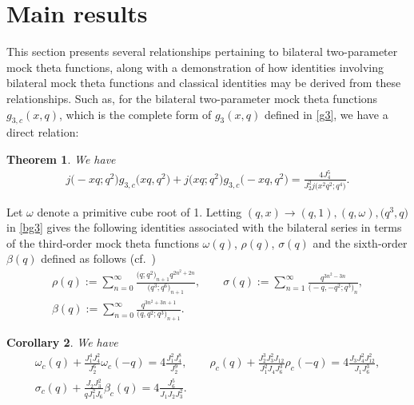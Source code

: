 \documentclass[pdftex]{sigma}
\numberwithin{equation}{section}
\newtheorem{Theorem}{Theorem}[section]
\newtheorem{Corollary}[Theorem]{Corollary}
\begin{document}
\section{Main results}

This section presents several relationships pertaining to bilateral two-parameter mock theta functions, along with a demonstration of how identities involving bilateral mock theta functions and classical identities may be derived from these relationships. Such as, for the bilateral two-parameter mock theta functions $g_{3,c}(x,q)$, which is the complete form of $g_3(x,q)$ defined in \eqref{g3}, we have a direct relation:
\begin{Theorem}\label{bg3-1}
We have
\begin{align} \label{bg3}
j\bigl(-xq;q^2\bigr)g_{3,c}\bigl(xq,q^2\bigr)+j\bigl(xq;q^2\bigr)g_{3,c}\bigl(-xq,q^2\bigr)=\frac{4J_4^5}{J_2^2j\bigl(x^2q^2;q^4\bigr)}.
\end{align}
\end{Theorem}
Let $\omega$ denote a primitive cube root of 1. Letting $(q,x)\rightarrow(q,1), (q,\omega), \bigl(q^3,q\bigr)$ in \eqref{bg3} gives the following identities associated with the bilateral series in terms of the third-order mock theta functions $\omega(q)$, $\rho(q)$, $\sigma(q)$ and the sixth-order $\beta(q)$ defined as follows (cf.\ \cite{GM1,GM,R})
\begin{gather*}
\rho(q):=\sum_{n=0}^{\infty}\frac{\bigl(q;q^2\bigr)_{n+1}q^{2n^2+2n}}{\bigl(q^3;q^6\bigr)_{n+1}},\qquad
\sigma(q):=\sum_{n=1}^{\infty}\frac{q^{3n^2-3n}}{\bigl(-q,-q^2;q^3\bigr)_n},\\
 \beta(q):=\sum_{n=0}^{\infty}\frac{q^{3n^2+3n+1}}{\bigl(q,q^2;q^3\bigr)_{n+1}}.
\end{gather*}
\begin{Corollary} \label{coro1}
We have
\begin{gather*}
\omega_c(q)+\frac{J_1^4J_4^2}{J_2^6}\omega_c(-q)=4\frac{J_1^2J_4^8}{J_2^9},\qquad
\rho_c(q)+\frac{J_2^3J_3^2J_{12}}{J_1^2J_4J_6^3}\rho_c(-q)=4\frac{J_3J_4^2J_{12}^2}{J_1J_6^3},\\
\sigma_c(q)+\frac{J_2J_3^2}{qJ_1^2J_6}\beta_c(q)=4\frac{J_6^5}{J_1J_2J_3^2}.
\end{gather*}
\end{Corollary}
\end{document}
